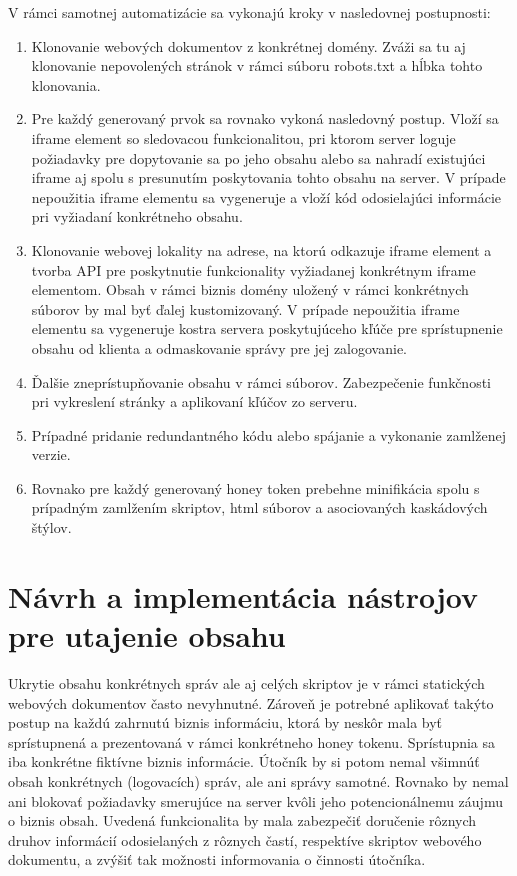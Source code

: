 \documentclass[conference, 11pt,slovak,a4paper,twoside]{IEEEtran}
\begin{document}
V rámci samotnej automatizácie sa vykonajú kroky v nasledovnej postupnosti:
\begin{enumerate}
	\item Klonovanie webových dokumentov z konkrétnej domény. Zváži sa tu aj klonovanie nepovolených stránok v rámci súboru robots.txt a hĺbka tohto klonovania.

	\item Pre každý generovaný prvok sa rovnako vykoná nasledovný postup. Vloží sa iframe element so sledovacou funkcionalitou, pri ktorom server loguje požiadavky pre dopytovanie sa po jeho obsahu alebo sa nahradí existujúci iframe aj spolu s presunutím poskytovania tohto obsahu na server. V prípade nepoužitia iframe elementu sa vygeneruje a vloží kód odosielajúci informácie pri vyžiadaní konkrétneho obsahu.
	
	\item Klonovanie webovej lokality na adrese, na ktorú odkazuje iframe element a tvorba API pre poskytnutie funkcionality vyžiadanej konkrétnym iframe elementom. Obsah v rámci biznis domény uložený v rámci konkrétnych súborov by mal byť ďalej kustomizovaný. V prípade nepoužitia iframe elementu sa vygeneruje kostra servera poskytujúceho kľúče pre sprístupnenie obsahu od klienta a odmaskovanie správy pre jej zalogovanie.
	
	\item Ďalšie zneprístupňovanie obsahu v rámci súborov. Zabezpečenie funkčnosti pri vykreslení stránky a aplikovaní kľúčov zo serveru.
	
	\item Prípadné pridanie redundantného kódu alebo spájanie a vykonanie zamlženej verzie.
	
	\item Rovnako pre každý generovaný honey token prebehne minifikácia spolu s prípadným zamlžením skriptov, html súborov a asociovaných kaskádových štýlov. 
\end{enumerate}


\section{Návrh a implementácia nástrojov pre utajenie obsahu} \label{designAndImplementationOfConcealingTools}

Ukrytie obsahu konkrétnych správ ale aj celých skriptov je v rámci statických webových dokumentov často nevyhnutné. Zároveň je potrebné aplikovať takýto postup na každú zahrnutú biznis informáciu, ktorá by neskôr mala byť sprístupnená a prezentovaná v rámci konkrétneho honey tokenu. Sprístupnia sa iba konkrétne fiktívne biznis informácie. Útočník by si potom nemal všimnúť obsah konkrétnych (logovacích) správ, ale ani správy samotné. Rovnako by nemal ani blokovať požiadavky smerujúce na server kvôli jeho potencionálnemu záujmu o biznis obsah. Uvedená funkcionalita by mala zabezpečiť doručenie rôznych druhov informácií odosielaných z rôznych častí, respektíve skriptov webového dokumentu, a zvýšiť tak možnosti informovania o činnosti útočníka.
\end{document}
